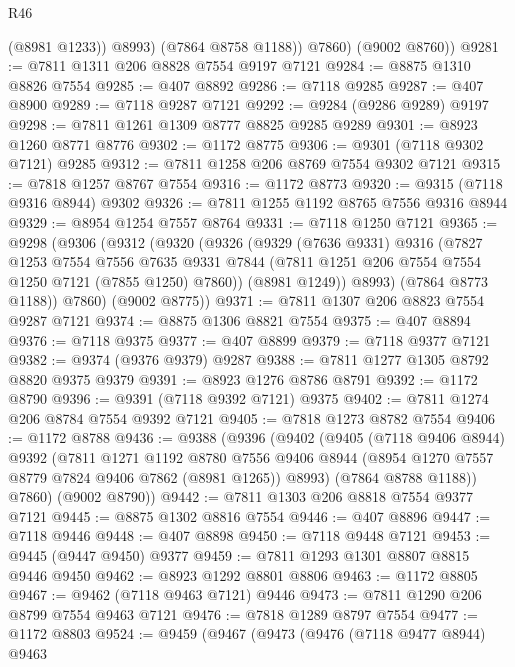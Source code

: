 \begin{lexlean}{R46}
\begin{coremodule}
              (@8981 @1233))
            @8993)
          (@7864 @8758 @1188))
        @7860)
      (@9002 @8760))
@9281 := @7811 @1311 @206 @8828 @7554 @9197 @7121
@9284 := @8875 @1310 @8826 @7554
@9285 := @407 @8892
@9286 := @7118 @9285
@9287 := @407 @8900
@9289 := @7118 @9287 @7121
@9292 := @9284 (@9286 @9289) @9197
@9298 := @7811 @1261 @1309 @8777 @8825 @9285 @9289
@9301 := @8923 @1260 @8771 @8776
@9302 := @1172 @8775
@9306 := @9301 (@7118 @9302 @7121) @9285
@9312 := @7811 @1258 @206 @8769 @7554 @9302 @7121
@9315 := @7818 @1257 @8767 @7554
@9316 := @1172 @8773
@9320 := @9315 (@7118 @9316 @8944) @9302
@9326 := @7811 @1255 @1192 @8765 @7556 @9316 @8944
@9329 := @8954 @1254 @7557 @8764
@9331 := @7118 @1250 @7121
@9365 := @9298
    (@9306
      (@9312
        (@9320
          (@9326
            (@9329
              (@7636 @9331)
              @9316
              (@7827
                @1253
                @7554
                @7556
                @7635
                @9331
                @7844
                (@7811 @1251 @206 @7554 @7554 @1250 @7121 (@7855 @1250) @7860))
              (@8981 @1249))
            @8993)
          (@7864 @8773 @1188))
        @7860)
      (@9002 @8775))
@9371 := @7811 @1307 @206 @8823 @7554 @9287 @7121
@9374 := @8875 @1306 @8821 @7554
@9375 := @407 @8894
@9376 := @7118 @9375
@9377 := @407 @8899
@9379 := @7118 @9377 @7121
@9382 := @9374 (@9376 @9379) @9287
@9388 := @7811 @1277 @1305 @8792 @8820 @9375 @9379
@9391 := @8923 @1276 @8786 @8791
@9392 := @1172 @8790
@9396 := @9391 (@7118 @9392 @7121) @9375
@9402 := @7811 @1274 @206 @8784 @7554 @9392 @7121
@9405 := @7818 @1273 @8782 @7554
@9406 := @1172 @8788
@9436 := @9388
    (@9396
      (@9402
        (@9405
          (@7118 @9406 @8944)
          @9392
          (@7811
            @1271
            @1192
            @8780
            @7556
            @9406
            @8944
            (@8954 @1270 @7557 @8779 @7824 @9406 @7862 (@8981 @1265))
            @8993)
          (@7864 @8788 @1188))
        @7860)
      (@9002 @8790))
@9442 := @7811 @1303 @206 @8818 @7554 @9377 @7121
@9445 := @8875 @1302 @8816 @7554
@9446 := @407 @8896
@9447 := @7118 @9446
@9448 := @407 @8898
@9450 := @7118 @9448 @7121
@9453 := @9445 (@9447 @9450) @9377
@9459 := @7811 @1293 @1301 @8807 @8815 @9446 @9450
@9462 := @8923 @1292 @8801 @8806
@9463 := @1172 @8805
@9467 := @9462 (@7118 @9463 @7121) @9446
@9473 := @7811 @1290 @206 @8799 @7554 @9463 @7121
@9476 := @7818 @1289 @8797 @7554
@9477 := @1172 @8803
@9524 := @9459
    (@9467
      (@9473
        (@9476
          (@7118 @9477 @8944)
          @9463

\end{coremodule}
\end{lexlean}
